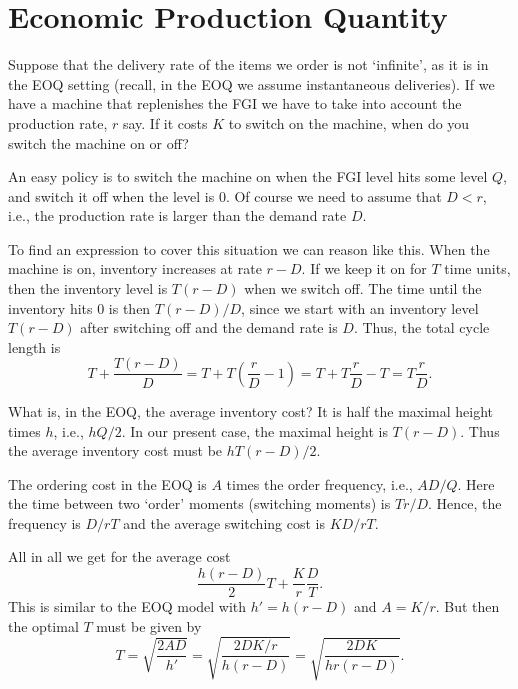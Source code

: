 \section{Economic Production Quantity}


\label{sec:finite-prod-rates}

\begin{exercise}
 Suppose that the delivery rate of the items we order is not
 `infinite', as it is in the EOQ setting (recall, in the EOQ we
 assume instantaneous deliveries). If we have a machine that
 replenishes the FGI we have to take into account the production
 rate, $r$ say. If it costs $K$ to switch on the machine, when do you switch the machine on or off?
 \begin{solution}
   An easy policy is to switch the machine on when the FGI level hits
   some level $Q$, and switch it off when the level is $0$. Of course
   we need to assume that $D<r$, i.e., the production rate is larger
   than the demand rate $D$. 

   To find an expression to cover this situation we can reason like
   this.  When the machine is on, inventory increases at rate
   $r-D$. If we keep it on for $T$ time units, then the inventory
   level is $T(r-D)$ when we switch off. The time until the inventory
   hits 0 is then $T(r-D)/D$, since we start with an inventory level
   $T(r-D)$ after switching off and the demand rate is $D$. Thus, the total cycle length is
   \begin{equation*}
     T + \frac{T(r-D)}D = T + T(\frac{r}D-1) = T + T\frac r D - T = T\frac r D.
   \end{equation*}

   What is, in the EOQ, the average inventory cost? It is half the
   maximal height times $h$, i.e., $hQ/2$. In our present case, the
   maximal height is $T(r-D)$. Thus the average inventory cost must
   be  $hT(r-D)/2$. 

   The ordering cost in the EOQ is $A$ times the order frequency, i.e., $A D/Q$. Here the time between two `order' moments (switching moments) is $Tr/D$. Hence, the frequency is $D/rT$ and the average switching cost is $K D/rT$. 

All in all we get for the average cost
\begin{equation*}
 \frac{h(r-D)}2 T + \frac{K}r \frac DT.
\end{equation*}
This is similar to the EOQ model with $h'=h(r-D)$ and $A=K/r$. But then the optimal $T$ must be given by
\begin{equation*}
 T = \sqrt{\frac{2AD}{h'}} = \sqrt{\frac{2DK/r}{h(r-D)}}=\sqrt{\frac{2DK}{hr(r-D)}}.
\end{equation*}
 \end{solution}
\end{exercise}

